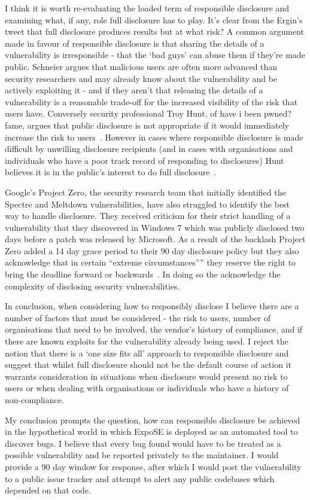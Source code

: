 \documentclass[]{final_report}
\begin{document}
I think it is worth re-evaluating the loaded term of responsible disclosure and examining what, if any, role full disclosure has to play. It's clear from the Ergin's tweet that full disclosure produces results but at what risk? A common argument made in favour of responsible disclosure is that sharing the details of a vulnerability is irresponsible - that the `bad guys' can abuse them if they're made public. Schneier argues that malicious users are often more advanced than security researchers and may already know about the vulnerability and be actively exploiting it - and if they aren't that releasing the details of a vulnerability is a reasonable trade-off for the increased visibility of the risk that users have. Conversely security professional Troy Hunt, of have i been pwned? fame, argues that public disclosure is not appropriate if it would immediately increase the risk to users~\cite{responsibility-of-public-disclosure}. However in cases where responsible disclosure is made difficult by unwilling disclosure recipients (and in cases with organisations and individuals who have a poor track record of responding to disclosures) Hunt believes it is in the public's interest to do full disclosure~\cite{kids-pass-responsible-disclosure}.

Google's Project Zero, the security research team that initially identified the Spectre and Meltdown vulnerabilities, have also struggled to identify the best way to handle disclosure. They received criticism for their strict handling of a vulnerability that they discovered in Windows 7 which was publicly disclosed two days before a patch was released by Microsoft. As a result of the backlash Project Zero added a 14 day grace period to their 90 day disclosure policy but they also acknowledge that in certain ``extreme circumstances”” they reserve the right to bring the deadline forward or backwards~\cite{project-zero-update-policy}. In doing so the acknowledge the complexity of disclosing security vulnerabilities.

In conclusion, when considering how to responsibly disclose I believe there are a number of factors that must be considered - the risk to users, number of organisations that need to be involved, the vendor's history of compliance, and if there are known exploits for the vulnerability already being used. I reject the notion that there is a `one size fits all' approach to responsible disclosure and suggest that whilst full disclosure should not be the default course of action it warrants consideration in situations when disclosure would present no risk to users or when dealing with organisations or individuals who have a history of non-compliance.

My conclusion prompts the question, how can responsible disclosure be achieved in the hypothetical world in which ExpoSE is deployed as an automated tool to discover bugs. I believe that every bug found would have to be treated as a possible vulnerability and be reported privately to the maintainer. I would provide a 90 day window for response, after which I would post the vulnerability to a public issue tracker and attempt to alert any public codebases which depended on that code.
\end{document}

